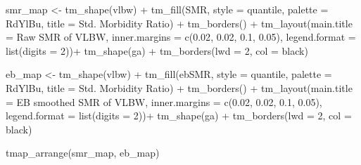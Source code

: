 \documentclass[
]{book}
\newenvironment{Shaded}{\begin{snugshade}}{\end{snugshade}}
\newcommand{\AttributeTok}[1]{\textcolor[rgb]{0.77,0.63,0.00}{#1}}
\newcommand{\DecValTok}[1]{\textcolor[rgb]{0.00,0.00,0.81}{#1}}
\newcommand{\FloatTok}[1]{\textcolor[rgb]{0.00,0.00,0.81}{#1}}
\newcommand{\FunctionTok}[1]{\textcolor[rgb]{0.00,0.00,0.00}{#1}}
\newcommand{\NormalTok}[1]{#1}
\newcommand{\OtherTok}[1]{\textcolor[rgb]{0.56,0.35,0.01}{#1}}
\newcommand{\SpecialCharTok}[1]{\textcolor[rgb]{0.00,0.00,0.00}{#1}}
\newcommand{\StringTok}[1]{\textcolor[rgb]{0.31,0.60,0.02}{#1}}
\begin{document}
\begin{Shaded}
\begin{Highlighting}[]
\NormalTok{smr\_map }\OtherTok{\textless{}{-}} \FunctionTok{tm\_shape}\NormalTok{(vlbw) }\SpecialCharTok{+}
  \FunctionTok{tm\_fill}\NormalTok{(}\StringTok{\textquotesingle{}SMR\textquotesingle{}}\NormalTok{,}
          \AttributeTok{style =} \StringTok{\textquotesingle{}quantile\textquotesingle{}}\NormalTok{, }\AttributeTok{palette =} \StringTok{\textquotesingle{}{-}RdYlBu\textquotesingle{}}\NormalTok{,}
          \AttributeTok{title =} \StringTok{\textquotesingle{}Std. Morbidity Ratio\textquotesingle{}}\NormalTok{) }\SpecialCharTok{+} 
  \FunctionTok{tm\_borders}\NormalTok{() }\SpecialCharTok{+}
  \FunctionTok{tm\_layout}\NormalTok{(}\AttributeTok{main.title =} \StringTok{\textquotesingle{}Raw SMR of VLBW\textquotesingle{}}\NormalTok{,}
            \AttributeTok{inner.margins =} \FunctionTok{c}\NormalTok{(}\FloatTok{0.02}\NormalTok{, }\FloatTok{0.02}\NormalTok{, }\FloatTok{0.1}\NormalTok{, }\FloatTok{0.05}\NormalTok{),}
            \AttributeTok{legend.format =} \FunctionTok{list}\NormalTok{(}\AttributeTok{digits =} \DecValTok{2}\NormalTok{))}\SpecialCharTok{+}
  \FunctionTok{tm\_shape}\NormalTok{(ga) }\SpecialCharTok{+}
  \FunctionTok{tm\_borders}\NormalTok{(}\AttributeTok{lwd =} \DecValTok{2}\NormalTok{, }\AttributeTok{col =} \StringTok{\textquotesingle{}black\textquotesingle{}}\NormalTok{)}

\NormalTok{eb\_map }\OtherTok{\textless{}{-}} \FunctionTok{tm\_shape}\NormalTok{(vlbw) }\SpecialCharTok{+}
  \FunctionTok{tm\_fill}\NormalTok{(}\StringTok{\textquotesingle{}ebSMR\textquotesingle{}}\NormalTok{,}
          \AttributeTok{style =} \StringTok{\textquotesingle{}quantile\textquotesingle{}}\NormalTok{, }
          \AttributeTok{palette =} \StringTok{\textquotesingle{}{-}RdYlBu\textquotesingle{}}\NormalTok{,}
          \AttributeTok{title =} \StringTok{\textquotesingle{}Std. Morbidity Ratio\textquotesingle{}}\NormalTok{) }\SpecialCharTok{+} 
  \FunctionTok{tm\_borders}\NormalTok{() }\SpecialCharTok{+}
  \FunctionTok{tm\_layout}\NormalTok{(}\AttributeTok{main.title =} \StringTok{\textquotesingle{}EB smoothed SMR of VLBW\textquotesingle{}}\NormalTok{,}
            \AttributeTok{inner.margins =} \FunctionTok{c}\NormalTok{(}\FloatTok{0.02}\NormalTok{, }\FloatTok{0.02}\NormalTok{, }\FloatTok{0.1}\NormalTok{, }\FloatTok{0.05}\NormalTok{),}
            \AttributeTok{legend.format =} \FunctionTok{list}\NormalTok{(}\AttributeTok{digits =} \DecValTok{2}\NormalTok{))}\SpecialCharTok{+}
  \FunctionTok{tm\_shape}\NormalTok{(ga) }\SpecialCharTok{+}
  \FunctionTok{tm\_borders}\NormalTok{(}\AttributeTok{lwd =} \DecValTok{2}\NormalTok{, }\AttributeTok{col =} \StringTok{\textquotesingle{}black\textquotesingle{}}\NormalTok{)}

\FunctionTok{tmap\_arrange}\NormalTok{(smr\_map, eb\_map)}
\end{Highlighting}
\end{Shaded}
\end{document}
